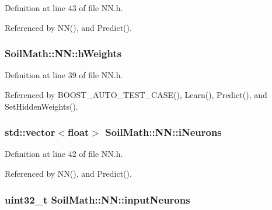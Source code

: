 Definition at line 43 of file N\+N.\+h.



Referenced by N\+N(), and Predict().

\hypertarget{class_soil_math_1_1_n_n_a46db1b2814215509a7345fccc8928efe}{}
\subsubsection[{h\+Weights}]{ Soil\+Math\+::\+N\+N\+::h\+Weights}\label{class_soil_math_1_1_n_n_a46db1b2814215509a7345fccc8928efe}


Definition at line 39 of file N\+N.\+h.



Referenced by B\+O\+O\+S\+T\+\_\+\+A\+U\+T\+O\+\_\+\+T\+E\+S\+T\+\_\+\+C\+A\+S\+E(), Learn(), Predict(), and Set\+Hidden\+Weights().

\hypertarget{class_soil_math_1_1_n_n_aa5a6a6014722338fb8af2f79d6187998}{}
\subsubsection[{i\+Neurons}]{\setlength{\rightskip}{0pt plus 5cm}std\+::vector$<$float$>$ Soil\+Math\+::\+N\+N\+::i\+Neurons\hspace{0.3cm}{\ttfamily [private]}}\label{class_soil_math_1_1_n_n_aa5a6a6014722338fb8af2f79d6187998}


Definition at line 42 of file N\+N.\+h.



Referenced by N\+N(), and Predict().

\hypertarget{class_soil_math_1_1_n_n_a51723ae01e9b0a95c9aa6ac4f4c569fc}{}
\subsubsection[{input\+Neurons}]{\setlength{\rightskip}{0pt plus 5cm}uint32\+\_\+t Soil\+Math\+::\+N\+N\+::input\+Neurons\hspace{0.3cm}{\ttfamily [private]}}\label{class_soil_math_1_1_n_n_a51723ae01e9b0a95c9aa6ac4f4c569fc}


